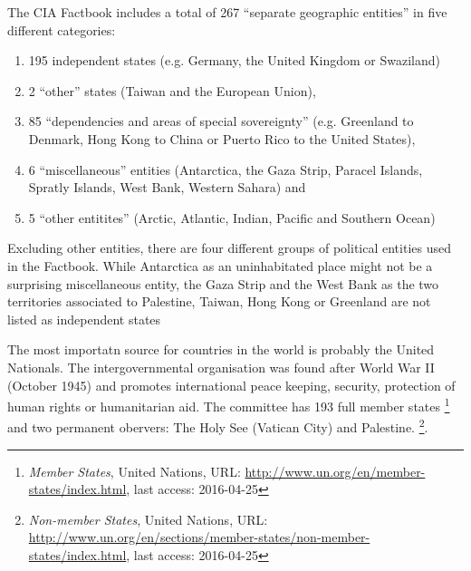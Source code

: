 The CIA Factbook includes a total of 267 ``separate geographic entities'' in five different categories:
\begin{enumerate}
  \item 195 independent states (e.g. Germany, the United Kingdom or Swaziland)
  \item 2 ``other'' states (Taiwan and the European Union),
  \item 85 ``dependencies and areas of special sovereignty'' (e.g. Greenland to Denmark, Hong Kong to China or Puerto Rico to the United States),
  \item 6 ``miscellaneous'' entities (Antarctica, the Gaza Strip, Paracel Islands, Spratly Islands, West Bank, Western Sahara) and
  \item 5 ``other entitites'' (Arctic, Atlantic, Indian, Pacific and Southern Ocean)
\end{enumerate}

Excluding other entities, there are four different groups of political entities used in the Factbook. While Antarctica as an uninhabitated place might not be a surprising miscellaneous entity, the Gaza Strip and the West Bank as the two territories associated to Palestine, Taiwan, Hong Kong or Greenland are not listed as independent states

The most importatn source for countries in the world is probably the United Nationals. The intergovernmental organisation was found after World War II (October 1945) and promotes international peace keeping, security, protection of human rights or humanitarian aid. The committee has 193 full member states
\footnote{\textit{Member States}, United Nations, URL: \url{http://www.un.org/en/member-states/index.html}, last access: 2016-04-25}
and two permanent obervers: The Holy See (Vatican City) and Palestine.
\footnote{\textit{Non-member States}, United Nations, URL: \url{http://www.un.org/en/sections/member-states/non-member-states/index.html}, last access: 2016-04-25}.

